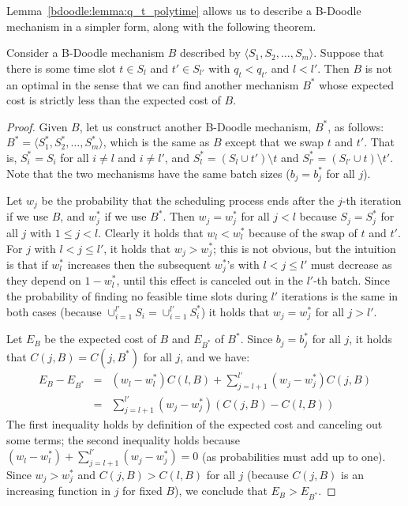 Lemma~\ref{bdoodle:lemma:q_t_polytime} allows us to describe a B-Doodle mechanism in a simpler form, along with the following theorem. 
\begin{theorem} \label{bdoodle:thm:swap_argument}
Consider a B-Doodle mechanism $B$ described by $\langle S_1, S_2, \dots, S_m \rangle$. Suppose that there is some time slot $t \in S_l$ and $t'\in S_{l'}$ with $q_t < q_{t'}$ and $l < l'$. Then $B$ is not an optimal in the sense that we can find another mechanism $B^*$ whose expected cost is strictly less than the expected cost of $B$.
\end{theorem}
\begin{proof}
Given $B$, let us construct another B-Doodle mechanism, $B^*$, as follows: $B^* = \langle S^*_1, S^*_2, \dots, S^*_m \rangle$, which is the same as $B$ except that we swap $t$ and $t'$. That is, $S^*_i = S_i$ for all $i \neq l$ and $i\neq l'$, and $S^*_{l} = (S_l \cup t') \setminus t$ and $S^*_{l'} = (S_{l'} \cup t) \setminus t'$. Note that the two mechanisms have the same batch sizes ($b_j = b^*_j$ for all $j$). 

Let $w_j$ be the probability that the scheduling process ends after the $j$-th iteration if we use $B$, and $w_j^*$ if we use $B^*$. Then $w_j = w_j^*$ for all $j < l$ because $S_j = S^*_j$ for all $j$ with $1 \leq j < l$. Clearly it holds that $w_l < w_l^*$ because of the swap of $t$ and $t'$. For $j$ with $l < j \leq l'$, it holds that $w_j > w_j^*$; this is not obvious, but the intuition is that if $w_l^*$ increases then the subsequent $w_j^*$'s with $l < j \leq l'$ must decrease as they depend on $1-w_l^*$, until this effect is canceled out in the $l'$-th batch. Since the probability of finding no feasible time slots during $l'$ iterations is the same in both cases (because $\cup_{i=1}^{l'} S_i = \cup_{i=1}^{l'}S^*_i$) it holds that $w_j = w_j^*$ for all $j > l'$. 

Let $E_B$ be the expected cost of $B$ and $E_{B^*}$ of $B^*$. Since $b_j = b^*_j$ for all $j$, it holds that $C(j, B) = C(j, B^*)$ for all $j$, and we have:
\begin{eqnarray}
	E_B - E_{B^*} 
	&=& (w_l - w_l^*) C(l, B) + \sum_{j=l+1}^{l'} (w_j - w_j^*)C(j, B) \\
	&=& \sum_{j=l+1}^{l'} (w_j - w_j^*)(C(j, B) - C(l, B))
\end{eqnarray} 
The first inequality holds by definition of the expected cost and canceling out some terms; the second inequality holds because $(w_l - w_l^*) + \sum_{j=l+1}^{l'} (w_j - w_j^*) = 0$ (as probabilities must add up to one). Since $w_j > w_j^*$ and $C(j, B) > C(l, B)$ for all $j$ (because $C(j, B)$ is an increasing function in $j$ for fixed $B$), we conclude that $E_{B} > E_{B^*}$.
\end{proof}
